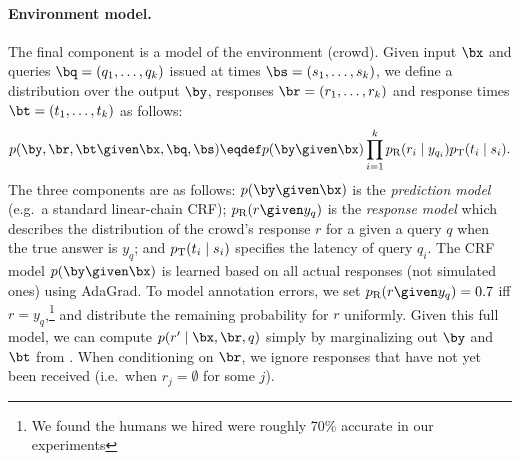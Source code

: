 \paragraph{Environment model.}

The final component is a model of the environment (crowd).
Given input $\bx$ and queries $\bq = (q_1, \dots, q_k)$ issued at times $\bs = (s_1, \dots, s_k)$,
we define a distribution over the output $\by$, responses $\br = (r_1, \dots, r_k)$
and response times $\bt = (t_1, \dots, t_k)$ as follows:
\begin{align}
  \label{eqn:otj:dynamics}
p(\by, \br, \bt \given \bx, \bq, \bs) \eqdef p(\by \given \bx) \prod_{i=1}^k \presp(r_i \mid y_{q_i}) \ptime(t_i \mid s_i).
\end{align}
The three components are as follows:
$p(\by \given \bx)$ is the \emph{prediction model} (e.g.\ a standard linear-chain CRF);
$\presp(r \given y_q)$ is the \emph{response model} which describes the
distribution of the crowd's response $r$ for a given a query $q$ when the true
answer is $y_q$;
and $p_{\text{T}}(t_i \mid s_i)$ specifies the latency of query $q_i$.
The CRF model $p(\by \given \bx)$ is learned based on all actual responses
(not simulated ones) using AdaGrad.
To model annotation errors, we set $\presp(r \given y_q)
= 0.7$ iff $r = y_q$,\footnote{We found the humans we hired were roughly 70\%
accurate in our experiments} and distribute the remaining probability for $r$
uniformly.
%
%
Given this full model, we can compute $p(r' \mid \bx, \br, q)$ simply by marginalizing out $\by$ and $\bt$ from .
When conditioning on $\br$, we ignore responses that have not yet been received (i.e.\ when $r_j = \emptyset$ for some $j$).

